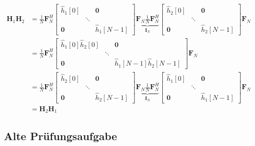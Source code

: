\documentclass[11pt]{article}
\begin{document}
\begin{align*}
    \mathbf{H}_1 \mathbf{H}_2 &= \frac{1}{N} \mathbf{F}_N^H \begin{bmatrix}
        \hat{h}_1[0] & & \mathbf{0} \\
        & \ddots & \\
        \mathbf{0} & & \hat{h}_1[N-1]
    \end{bmatrix} \underbrace{\mathbf{F}_N \frac{1}{N} \mathbf{F}_N^H}_{\mathbf{I}_N}  \begin{bmatrix}
        \hat{h}_2[0] & & \mathbf{0} \\
        & \ddots & \\
        \mathbf{0} & & \hat{h}_2[N-1]
    \end{bmatrix}\mathbf{F}_N \\
    &= \frac{1}{N} \mathbf{F}_N^H \begin{bmatrix}
        \hat{h}_1[0]\hat{h}_2[0] & & \mathbf{0} \\
        & \ddots & \\
        \mathbf{0} & & \hat{h}_1[N-1]\hat{h}_2[N-1]
    \end{bmatrix}\mathbf{F}_N \\
    &= \frac{1}{N} \mathbf{F}_N^H \begin{bmatrix}
        \hat{h}_2[0] & & \mathbf{0} \\
        & \ddots & \\
        \mathbf{0} & & \hat{h}_2[N-1]
    \end{bmatrix} \underbrace{\mathbf{F}_N \frac{1}{N} \mathbf{F}_N^H}_{\mathbf{I}_N}  \begin{bmatrix}
        \hat{h}_1[0] & & \mathbf{0} \\
        & \ddots & \\
        \mathbf{0} & & \hat{h}_1[N-1]
    \end{bmatrix} \mathbf{F}_N \\
    &= \mathbf{H}_2 \mathbf{H}_1
\end{align*}


\subsection*{Alte Prüfungsaufgabe}
\vspace*{-0.5cm}
\end{document}
